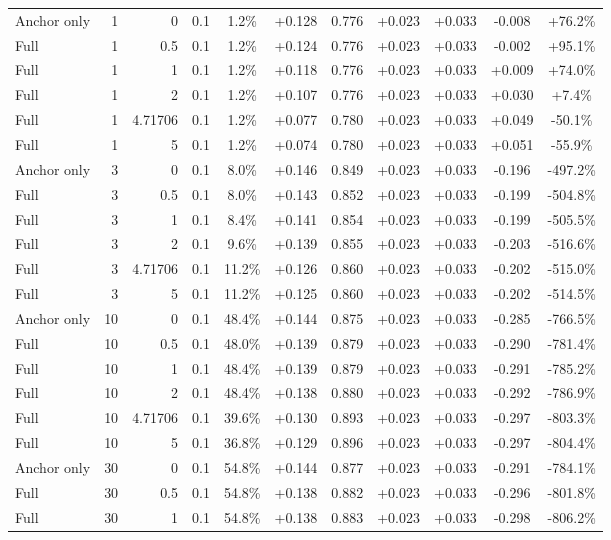 \begin{table}[htbp]
\begin{tabular}{lrrrccccccc}
Anchor only & 1 & 0 & 0.1 & 1.2\% & +0.128 & 0.776 & +0.023 & +0.033 & -0.008 & +76.2\% \\
Full & 1 & 0.5 & 0.1 & 1.2\% & +0.124 & 0.776 & +0.023 & +0.033 & -0.002 & +95.1\% \\
Full & 1 & 1 & 0.1 & 1.2\% & +0.118 & 0.776 & +0.023 & +0.033 & +0.009 & +74.0\% \\
Full & 1 & 2 & 0.1 & 1.2\% & +0.107 & 0.776 & +0.023 & +0.033 & +0.030 & +7.4\% \\
Full & 1 & 4.71706 & 0.1 & 1.2\% & +0.077 & 0.780 & +0.023 & +0.033 & +0.049 & -50.1\% \\
Full & 1 & 5 & 0.1 & 1.2\% & +0.074 & 0.780 & +0.023 & +0.033 & +0.051 & -55.9\% \\
Anchor only & 3 & 0 & 0.1 & 8.0\% & +0.146 & 0.849 & +0.023 & +0.033 & -0.196 & -497.2\% \\
Full & 3 & 0.5 & 0.1 & 8.0\% & +0.143 & 0.852 & +0.023 & +0.033 & -0.199 & -504.8\% \\
Full & 3 & 1 & 0.1 & 8.4\% & +0.141 & 0.854 & +0.023 & +0.033 & -0.199 & -505.5\% \\
Full & 3 & 2 & 0.1 & 9.6\% & +0.139 & 0.855 & +0.023 & +0.033 & -0.203 & -516.6\% \\
Full & 3 & 4.71706 & 0.1 & 11.2\% & +0.126 & 0.860 & +0.023 & +0.033 & -0.202 & -515.0\% \\
Full & 3 & 5 & 0.1 & 11.2\% & +0.125 & 0.860 & +0.023 & +0.033 & -0.202 & -514.5\% \\
Anchor only & 10 & 0 & 0.1 & 48.4\% & +0.144 & 0.875 & +0.023 & +0.033 & -0.285 & -766.5\% \\
Full & 10 & 0.5 & 0.1 & 48.0\% & +0.139 & 0.879 & +0.023 & +0.033 & -0.290 & -781.4\% \\
Full & 10 & 1 & 0.1 & 48.4\% & +0.139 & 0.879 & +0.023 & +0.033 & -0.291 & -785.2\% \\
Full & 10 & 2 & 0.1 & 48.4\% & +0.138 & 0.880 & +0.023 & +0.033 & -0.292 & -786.9\% \\
Full & 10 & 4.71706 & 0.1 & 39.6\% & +0.130 & 0.893 & +0.023 & +0.033 & -0.297 & -803.3\% \\
Full & 10 & 5 & 0.1 & 36.8\% & +0.129 & 0.896 & +0.023 & +0.033 & -0.297 & -804.4\% \\
Anchor only & 30 & 0 & 0.1 & 54.8\% & +0.144 & 0.877 & +0.023 & +0.033 & -0.291 & -784.1\% \\
Full & 30 & 0.5 & 0.1 & 54.8\% & +0.138 & 0.882 & +0.023 & +0.033 & -0.296 & -801.8\% \\
Full & 30 & 1 & 0.1 & 54.8\% & +0.138 & 0.883 & +0.023 & +0.033 & -0.298 & -806.2\% \\

\end{tabular}
\end{table}

